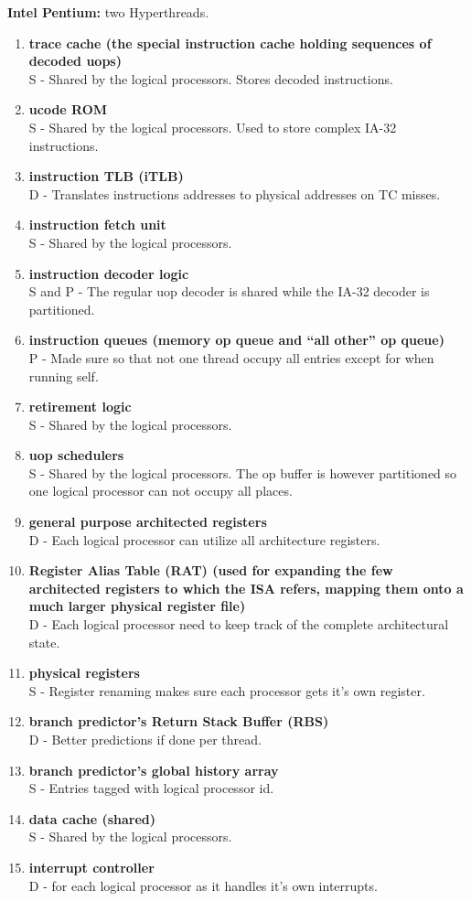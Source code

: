\documentclass[a4paper]{article}
\begin{document}
\textbf{Intel Pentium:} two Hyperthreads.
\begin{enumerate}
\item    
\textbf{trace cache (the special instruction cache holding sequences of decoded uops)\\}
S - Shared by the logical processors. Stores decoded instructions.
\item
\textbf{ucode ROM\\}
S - Shared by the logical processors. Used to store complex IA-32 instructions.
\item
\textbf{instruction TLB (iTLB)\\}
D - Translates instructions addresses to physical addresses on TC misses.
\item
\textbf{instruction fetch unit\\}
    S - Shared by the logical processors.
\item
\textbf{instruction decoder logic\\}
S and P - The regular uop decoder is shared while the IA-32 decoder is partitioned.
\item
\textbf{instruction queues (memory op queue and “all other” op queue)\\}
P - Made sure so that not one thread occupy all entries except for when running self.
\item
\textbf{retirement logic\\}
S - Shared by the logical processors.
\item
\textbf{uop schedulers\\}
S - Shared by the logical processors. The op buffer is however partitioned so one logical processor can not occupy all places.
\item
\textbf{general purpose architected registers\\}
D - Each logical processor can utilize all architecture registers.
\item
\textbf{Register Alias Table (RAT) (used for expanding the few architected registers to which the ISA refers, mapping them onto a much larger physical register file)\\}
D - Each logical processor need to keep track of the complete architectural state.    
\item
\textbf{physical registers\\}
S - Register renaming makes sure each processor gets it’s own register.
\item
\textbf{branch predictor’s Return Stack Buffer (RBS)\\}
    D - Better predictions if done per thread.
\item
\textbf{branch predictor’s global history array\\}
    S - Entries tagged with logical processor id.
\item
\textbf{data cache (shared)\\}
S - Shared by the logical processors.
\item
\textbf{interrupt controller\\}
D - for each logical processor as it handles it’s own interrupts.


\end{enumerate}
\end{document}
